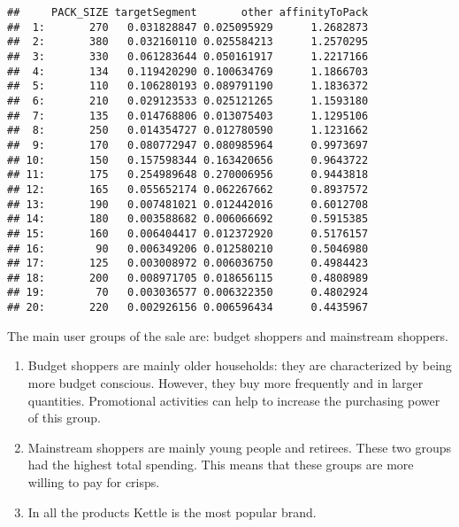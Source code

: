 \documentclass[
]{article}
\begin{document}
\begin{verbatim}
##     PACK_SIZE targetSegment       other affinityToPack
##  1:       270   0.031828847 0.025095929      1.2682873
##  2:       380   0.032160110 0.025584213      1.2570295
##  3:       330   0.061283644 0.050161917      1.2217166
##  4:       134   0.119420290 0.100634769      1.1866703
##  5:       110   0.106280193 0.089791190      1.1836372
##  6:       210   0.029123533 0.025121265      1.1593180
##  7:       135   0.014768806 0.013075403      1.1295106
##  8:       250   0.014354727 0.012780590      1.1231662
##  9:       170   0.080772947 0.080985964      0.9973697
## 10:       150   0.157598344 0.163420656      0.9643722
## 11:       175   0.254989648 0.270006956      0.9443818
## 12:       165   0.055652174 0.062267662      0.8937572
## 13:       190   0.007481021 0.012442016      0.6012708
## 14:       180   0.003588682 0.006066692      0.5915385
## 15:       160   0.006404417 0.012372920      0.5176157
## 16:        90   0.006349206 0.012580210      0.5046980
## 17:       125   0.003008972 0.006036750      0.4984423
## 18:       200   0.008971705 0.018656115      0.4808989
## 19:        70   0.003036577 0.006322350      0.4802924
## 20:       220   0.002926156 0.006596434      0.4435967
\end{verbatim}

The main user groups of the sale are: budget shoppers and mainstream
shoppers.

\begin{enumerate}
\def\labelenumi{\arabic{enumi}.}
\item
  Budget shoppers are mainly older households: they are characterized by
  being more budget conscious. However, they buy more frequently and in
  larger quantities. Promotional activities can help to increase the
  purchasing power of this group.
\item
  Mainstream shoppers are mainly young people and retirees. These two
  groups had the highest total spending. This means that these groups
  are more willing to pay for crisps.
\item
  In all the products Kettle is the most popular brand.
\end{enumerate}
\end{document}
